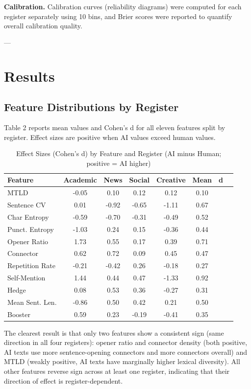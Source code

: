 \documentclass{article}
\begin{document}
\textbf{Calibration.} Calibration curves (reliability diagrams) were computed for each register separately using 10 bins, and Brier scores were reported to quantify overall calibration quality.

---

\section{Results}

\subsection{Feature Distributions by Register}

Table 2 reports mean values and Cohen's d for all eleven features split by register. Effect sizes are positive when AI values exceed human values.


\begin{table}[H]
\centering
\small
\begin{tabular}{lccccccc}
\toprule
\textbf{Feature} & \textbf{Academic} & \textbf{News} & \textbf{Social} & \textbf{Creative} & \textbf{Mean} & \textbf{d} & \textbf{} \\
\midrule
MTLD & -0.05 & 0.10 & 0.12 & 0.12 & 0.10 &  &  \\
Sentence CV & 0.01 & -0.92 & -0.65 & -1.11 & 0.67 &  &  \\
Char Entropy & -0.59 & -0.70 & -0.31 & -0.49 & 0.52 &  &  \\
Punct. Entropy & -1.03 & 0.24 & 0.15 & -0.36 & 0.44 &  &  \\
Opener Ratio & 1.73 & 0.55 & 0.17 & 0.39 & 0.71 &  &  \\
Connector & 0.62 & 0.72 & 0.09 & 0.45 & 0.47 &  &  \\
Repetition Rate & -0.21 & -0.42 & 0.26 & -0.18 & 0.27 &  &  \\
Self-Mention & 1.44 & 0.44 & 0.47 & -1.33 & 0.92 &  &  \\
Hedge & 0.08 & 0.53 & 0.36 & -0.27 & 0.31 &  &  \\
Mean Sent. Len. & -0.86 & 0.50 & 0.42 & 0.21 & 0.50 &  &  \\
Booster & 0.59 & 0.23 & -0.19 & -0.41 & 0.35 &  &  \\
\bottomrule
\end{tabular}
\caption{Effect Sizes (Cohen's d) by Feature and Register (AI minus Human; positive = AI higher)}
\end{table}

The clearest result is that only two features show a consistent sign (same direction in all four registers): opener ratio and connector density (both positive, AI texts use more sentence-opening connectors and more connectors overall) and MTLD (weakly positive, AI texts have marginally higher lexical diversity). All other features reverse sign across at least one register, indicating that their direction of effect is register-dependent.
\end{document}
